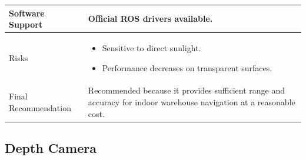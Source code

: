 \documentclass[12pt,a4paper]{article}
\begin{document}
\begin{longtable}{|p{4cm}|p{10cm}|}
Software Support &
Official ROS drivers available. \\
\hline

Risks &
\begin{itemize}
\item Sensitive to direct sunlight.
\item Performance decreases on transparent surfaces.
\end{itemize}
\\
\hline

Final Recommendation &
Recommended because it provides sufficient range and accuracy for indoor warehouse navigation at a reasonable cost. \\
\hline

\end{longtable}

\subsection{Depth Camera}
\end{document}
